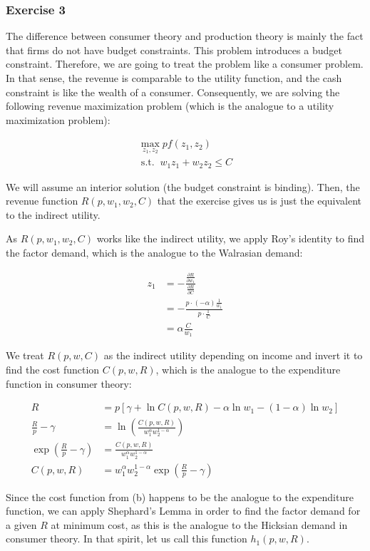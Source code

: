 {
\subsubsection*{Exercise 3}

The difference between consumer theory and production theory is mainly the fact that firms do not have budget constraints.
This problem introduces a budget constraint. Therefore, we are going to treat the problem like a consumer problem.
In that sense, the revenue is comparable to the utility function, and the cash constraint is like the wealth of a consumer.
Consequently, we are solving the following revenue maximization problem (which is the analogue to a utility maximization problem):

\begin{align*}
    \max_{z_1,z_2} pf(z_1,z_2) \\
    \operatorname{s.t.} \; w_1z_1 + w_2z_2 \leq C
\end{align*}

We will assume an interior solution (the budget constraint is binding).
Then, the revenue function $R(p, w_1, w_2, C)$ that the exercise gives us is just the equivalent to the indirect utility.

\begin{enumerate}[label=(\alph*)]
{\item 
As $R(p, w_1, w_2, C)$ works like the indirect utility, we apply Roy's identity to find the factor demand, which is the analogue to the Walrasian demand:

\begin{align*}
    z_1&=-\frac{\frac{\partial R}{\partial w_1}}{\frac{\partial R}{\partial C}} \\
    &= -\frac{p \cdot(-\alpha) \frac{1}{w_1}}{p \cdot \frac{1}{C}} \\
    &= \alpha \frac{C}{w_1}
\end{align*}
}
{\item 
We treat $R(p,w,C)$ as the indirect utility depending on income and invert it to find the cost function $C(p,w,R)$, which is the analogue to the expenditure function in consumer theory:

\begin{align*}
    R&=p\left[\gamma+\ln C(p,w,R)-\alpha \ln w_1-(1-\alpha) \ln w_2\right] \\
    \frac{R}{p}-\gamma &= \ln \left(\frac{C(p,w,R)}{w_1^\alpha w_2^{1-\alpha}} \right) \\
    \exp\left(\frac{R}{p}-\gamma\right)&=\frac{C(p,w,R)}{w_1^\alpha w_2^{1-\alpha}} \\
    C(p,w,R) &= w_1^\alpha w_2^{1-\alpha}\exp\left(\frac{R}{p}-\gamma\right)
\end{align*}
}
{\item 
Since the cost function from (b) happens to be the analogue to the expenditure function, we can apply Shephard's Lemma in order to find the factor demand for a given $R$ at minimum cost, as this is the analogue to the Hicksian demand in consumer theory.
In that spirit, let us call this function $h_1(p,w,R)$.

}
\end{enumerate}}
